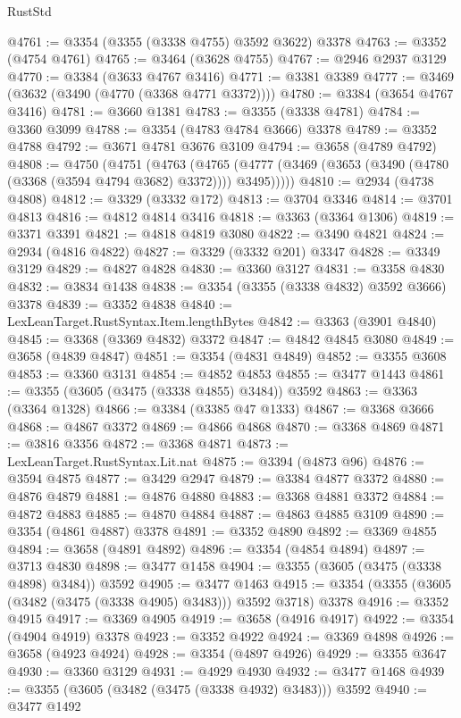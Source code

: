 \begin{lexlean}{RustStd}
\begin{coremodule}
@4761 := @3354 (@3355 (@3338 @4755) @3592 @3622) @3378
@4763 := @3352 (@4754 @4761)
@4765 := @3464 (@3628 @4755)
@4767 := @2946 @2937 @3129
@4770 := @3384 (@3633 @4767 @3416)
@4771 := @3381 @3389
@4777 := @3469 (@3632 (@3490 (@4770 (@3368 @4771 @3372))))
@4780 := @3384 (@3654 @4767 @3416)
@4781 := @3660 @1381
@4783 := @3355 (@3338 @4781)
@4784 := @3360 @3099
@4788 := @3354 (@4783 @4784 @3666) @3378
@4789 := @3352 @4788
@4792 := @3671 @4781 @3676 @3109
@4794 := @3658 (@4789 @4792)
@4808 := @4750
    (@4751
      (@4763
        (@4765 (@4777 (@3469 (@3653 (@3490 (@4780 (@3368 (@3594 @4794 @3682) @3372)))) @3495)))))
@4810 := @2934 (@4738 @4808)
@4812 := @3329 (@3332 @172)
@4813 := @3704 @3346
@4814 := @3701 @4813
@4816 := @4812 @4814 @3416
@4818 := @3363 (@3364 @1306)
@4819 := @3371 @3391
@4821 := @4818 @4819 @3080
@4822 := @3490 @4821
@4824 := @2934 (@4816 @4822)
@4827 := @3329 (@3332 @201) @3347
@4828 := @3349 @3129
@4829 := @4827 @4828
@4830 := @3360 @3127
@4831 := @3358 @4830
@4832 := @3834 @1438
@4838 := @3354 (@3355 (@3338 @4832) @3592 @3666) @3378
@4839 := @3352 @4838
@4840 := LexLeanTarget.RustSyntax.Item.lengthBytes
@4842 := @3363 (@3901 @4840)
@4845 := @3368 (@3369 @4832) @3372
@4847 := @4842 @4845 @3080
@4849 := @3658 (@4839 @4847)
@4851 := @3354 (@4831 @4849)
@4852 := @3355 @3608
@4853 := @3360 @3131
@4854 := @4852 @4853
@4855 := @3477 @1443
@4861 := @3355 (@3605 (@3475 (@3338 @4855) @3484)) @3592
@4863 := @3363 (@3364 @1328)
@4866 := @3384 (@3385 @47 @1333)
@4867 := @3368 @3666
@4868 := @4867 @3372
@4869 := @4866 @4868
@4870 := @3368 @4869
@4871 := @3816 @3356
@4872 := @3368 @4871
@4873 := LexLeanTarget.RustSyntax.Lit.nat
@4875 := @3394 (@4873 @96)
@4876 := @3594 @4875
@4877 := @3429 @2947
@4879 := @3384 @4877 @3372
@4880 := @4876 @4879
@4881 := @4876 @4880
@4883 := @3368 @4881 @3372
@4884 := @4872 @4883
@4885 := @4870 @4884
@4887 := @4863 @4885 @3109
@4890 := @3354 (@4861 @4887) @3378
@4891 := @3352 @4890
@4892 := @3369 @4855
@4894 := @3658 (@4891 @4892)
@4896 := @3354 (@4854 @4894)
@4897 := @3713 @4830
@4898 := @3477 @1458
@4904 := @3355 (@3605 (@3475 (@3338 @4898) @3484)) @3592
@4905 := @3477 @1463
@4915 := @3354 (@3355 (@3605 (@3482 (@3475 (@3338 @4905) @3483))) @3592 @3718) @3378
@4916 := @3352 @4915
@4917 := @3369 @4905
@4919 := @3658 (@4916 @4917)
@4922 := @3354 (@4904 @4919) @3378
@4923 := @3352 @4922
@4924 := @3369 @4898
@4926 := @3658 (@4923 @4924)
@4928 := @3354 (@4897 @4926)
@4929 := @3355 @3647
@4930 := @3360 @3129
@4931 := @4929 @4930
@4932 := @3477 @1468
@4939 := @3355 (@3605 (@3482 (@3475 (@3338 @4932) @3483))) @3592
@4940 := @3477 @1492

\end{coremodule}
\end{lexlean}
